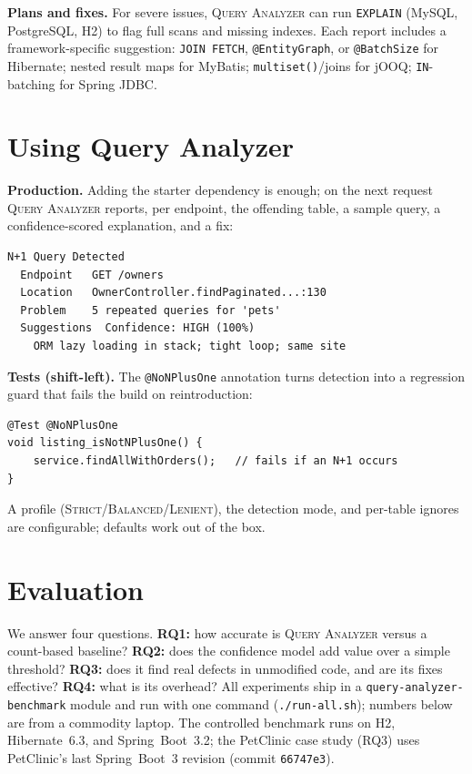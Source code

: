 \documentclass[sigplan,screen]{acmart}
\newcommand{\tool}{\textsc{Query Analyzer}}
\newcommand{\code}[1]{\texttt{\small #1}}
\begin{document}
\noindent\textbf{Plans and fixes.} For severe issues, \tool{} can run
\texttt{EXPLAIN} (MySQL, PostgreSQL, H2) to flag full scans and missing indexes.
Each report includes a framework-specific suggestion: \code{JOIN FETCH},
\code{@EntityGraph}, or \code{@BatchSize} for Hibernate; nested result maps for
MyBatis; \code{multiset()}/joins for jOOQ; \code{IN}-batching for Spring JDBC.

\section{Using Query Analyzer}
\noindent\textbf{Production.} Adding the starter dependency is enough; on the next
request \tool{} reports, per endpoint, the offending table, a sample query, a
confidence-scored explanation, and a fix:
\begin{lstlisting}[language={}]
N+1 Query Detected
  Endpoint   GET /owners
  Location   OwnerController.findPaginated...:130
  Problem    5 repeated queries for 'pets'
  Suggestions  Confidence: HIGH (100%)
    ORM lazy loading in stack; tight loop; same site
\end{lstlisting}

\noindent\textbf{Tests (shift-left).} The \code{@NoNPlusOne} annotation turns
detection into a regression guard that fails the build on reintroduction:
\begin{lstlisting}
@Test @NoNPlusOne
void listing_isNotNPlusOne() {
    service.findAllWithOrders();   // fails if an N+1 occurs
}
\end{lstlisting}
A profile (\textsc{Strict}/\textsc{Balanced}/\textsc{Lenient}), the detection
mode, and per-table ignores are configurable; defaults work out of the box.

\section{Evaluation}
\label{sec:eval}
We answer four questions. \textbf{RQ1:} how accurate is \tool{} versus a
count-based baseline? \textbf{RQ2:} does the confidence model add value over a
simple threshold? \textbf{RQ3:} does it find real defects in unmodified code, and
are its fixes effective? \textbf{RQ4:} what is its overhead? All experiments ship
in a \code{query-analyzer-benchmark} module and run with one command
(\code{./run-all.sh}); numbers below are from a commodity laptop. The controlled benchmark runs on H2,
Hibernate~6.3, and Spring~Boot~3.2; the PetClinic case study (RQ3) uses
PetClinic's last Spring~Boot~3 revision (commit \code{66747e3}).
\end{document}
